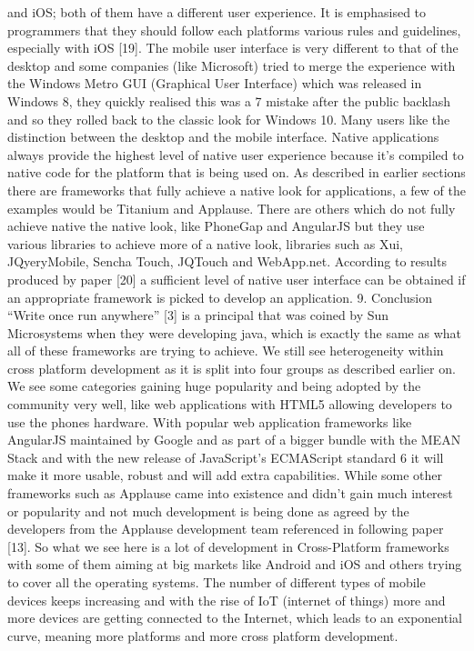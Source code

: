 and iOS; both of them have a different user experience. It is emphasised to
programmers that they should follow each platforms various rules and
guidelines, especially with iOS [19]. The mobile user interface is very
different to that of the desktop and some companies (like Microsoft) tried to
merge the experience with the Windows Metro GUI (Graphical User
Interface) which was released in Windows 8, they quickly realised this was a
7
mistake after the public backlash and so they rolled back to the classic look
for Windows 10. Many users like the distinction between the desktop and the
mobile interface. Native applications always provide the highest level of
native user experience because it’s compiled to native code for the platform
that is being used on. As described in earlier sections there are frameworks
that fully achieve a native look for applications, a few of the examples would
be Titanium and Applause. There are others which do not fully achieve native
the native look, like PhoneGap and AngularJS but they use various libraries
to achieve more of a native look, libraries such as Xui, JQyeryMobile, Sencha
Touch, JQTouch and WebApp.net. According to results produced by paper
[20] a sufficient level of native user interface can be obtained if an
appropriate framework is picked to develop an application.
9. Conclusion
“Write once run anywhere” [3] is a principal that was coined by Sun
Microsystems when they were developing java, which is exactly the same as
what all of these frameworks are trying to achieve. We still see heterogeneity
within cross platform development as it is split into four groups as described
earlier on. We see some categories gaining huge popularity and being
adopted by the community very well, like web applications with HTML5
allowing developers to use the phones hardware. With popular web
application frameworks like AngularJS maintained by Google and as part of a
bigger bundle with the MEAN Stack and with the new release of JavaScript’s
ECMAScript standard 6 it will make it more usable, robust and will add extra
capabilities. While some other frameworks such as Applause came into
existence and didn’t gain much interest or popularity and not much
development is being done as agreed by the developers from the Applause
development team referenced in following paper [13]. So what we see here
is a lot of development in Cross-Platform frameworks with some of them
aiming at big markets like Android and iOS and others trying to cover all the
operating systems. The number of different types of mobile devices keeps
increasing and with the rise of IoT (internet of things) more and more devices
are getting connected to the Internet, which leads to an exponential curve,
meaning more platforms and more cross platform development.

